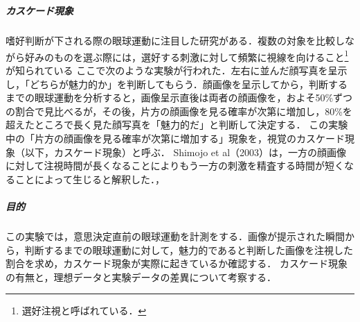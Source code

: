 \chapter{\kadaia}
\section{\purpose}
\paragraph{カスケード現象}
嗜好判断が下される際の眼球運動に注目した研究がある．複数の対象を比較しながら好みのものを選ぶ際には，選好する刺激に対して頻繁に視線を向けること\footnote{選好注視と呼ばれている．}が知られている
ここで次のような実験が行われた．左右に並んだ顔写真を呈示し，「どちらが魅力的か」を判断してもらう．顔画像を呈示してから，判断するまでの眼球運動を分析すると，画像呈示直後は両者の顔画像を，およそ50\%ずつの割合で見比べるが，その後，片方の顔画像を見る確率が次第に増加し，80\%を超えたところで長く見た顔写真を「魅力的だ」と判断して決定する．
この実験中の「片方の顔画像を見る確率が次第に増加する」現象を，視覚のカスケード現象（以下，カスケード現象）と呼ぶ．
Shimojo et al（2003）は，一方の顔画像に対して注視時間が長くなることによりもう一方の刺激を精査する時間が短くなることによって生じると解釈した．\hfill\cite[p.202]{美感}，\cite{潜在呈示した情報が選択判断時の視線の動きに与える影響}\par
\paragraph{目的}この実験では，意思決定直前の眼球運動を計測をする．画像が提示された瞬間から，判断するまでの眼球運動に対して，魅力的であると判断した画像を注視した割合を求め，カスケード現象が実際に起きているか確認する．
カスケード現象の有無と，理想データと実験データの差異について考察する．